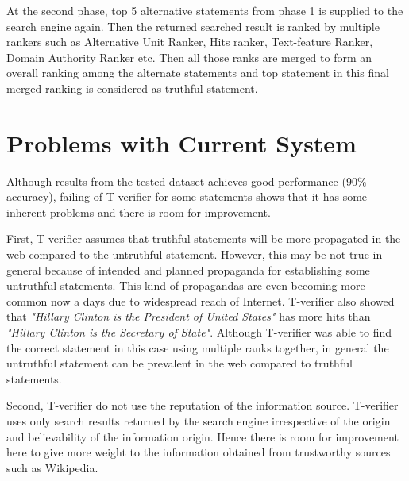 \documentclass[11pt]{article}
\begin{document}
At the second phase, top 5 alternative statements from phase 1 is supplied to the
search engine again. Then the returned searched result is ranked by multiple
rankers such as Alternative Unit Ranker, Hits ranker, Text-feature Ranker, Domain
Authority Ranker etc. Then all those ranks are merged to form an overall ranking
among the alternate statements and top statement in this final merged ranking is
considered as truthful statement.


\section{Problems with Current System}
Although results from the tested dataset achieves good performance (90\%
accuracy), failing of T-verifier for some statements shows that it has some
inherent problems and there is room for improvement.

First, T-verifier assumes that truthful statements will be more propagated in the
web compared to the untruthful statement. However, this may be not true in
general because of intended and planned propaganda for establishing some
untruthful statements. This kind of propagandas are even becoming more common now
a days due to widespread reach of Internet. T-verifier also showed that \emph{"Hillary
Clinton is the President of United States"} has more hits than \emph{"Hillary Clinton is
the Secretary of State"}. Although T-verifier was able to find the correct
statement in this case using multiple ranks together, in general the untruthful
statement can be prevalent in the web compared to truthful statements.

Second, T-verifier do not use the reputation of the information source.
T-verifier uses only search results returned by the search engine irrespective of
the origin and believability of the information origin. Hence there is room for
improvement here to give more weight to the information obtained from trustworthy
sources such as Wikipedia.
\end{document}
